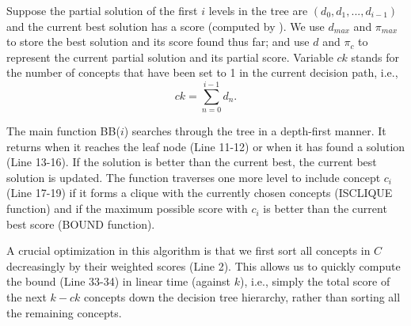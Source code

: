 Suppose the partial solution of the first $i$ levels in the tree
are $(d_0, d_1, ..., d_{i-1})$ and
the current best solution has a score (computed by ).
We use $d_{max}$ and $\pi_{max}$ to store the
best solution and its score found thus far; and use $d$ and $\pi_{c}$ to
represent the current partial solution and its partial score.
Variable $ck$ stands for the number of concepts that have been set to
1 in the current decision path, i.e.,
\[ck=\sum_{n=0}^{i-1}d_n.\]

The main function BB($i$) searches through the tree in a depth-first manner.
It returns when it reaches the leaf node (Line 11-12) or when it has found a
solution (Line 13-16). If the solution is better than the current best,
the current best solution is updated. The function traverses one
more level to include concept $c_i$ (Line 17-19) if it forms
a clique with the currently chosen concepts (ISCLIQUE function)
and if the maximum possible score with $c_i$ is better than
the current best score (BOUND function).

A crucial optimization in this algorithm is that we first sort
all concepts in $C$ decreasingly by their weighted scores (Line 2).
This allows us to quickly
compute the bound (Line 33-34) in linear time (against $k$), i.e., simply
the total score of the next $k-ck$ concepts down the decision
tree hierarchy, rather than sorting all the remaining concepts.

